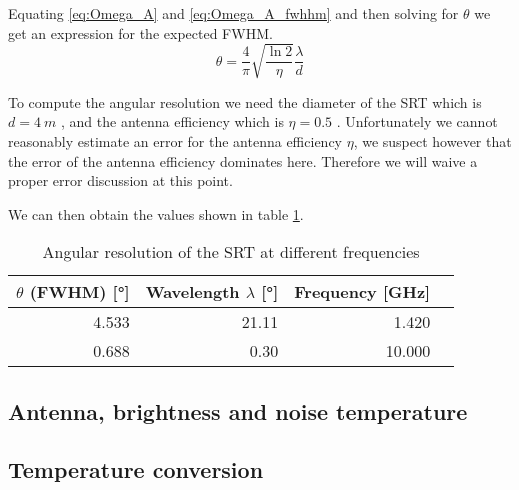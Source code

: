 Equating \eqref{eq:Omega_A} and \eqref{eq:Omega_A_fwhhm} and then solving for $\theta$ we get an expression for the expected FWHM.
\begin{equation}
    \theta = \frac{4}{\pi} \sqrt{\frac{\ln{2}}{\eta}}\frac{\lambda}{d}
\end{equation}

To compute the angular resolution we need the diameter of the SRT which is $d = \SI{4}{m}$ \cite[p. 4]{srt}, and the antenna efficiency which is $\eta = 0.5$ \cite[p. 2]{srt}.
Unfortunately we cannot reasonably estimate an error for the antenna efficiency $\eta$, we suspect however that the error of the antenna efficiency dominates here.
Therefore we will waive a proper error discussion at this point.

We can then obtain the values shown in table \ref{tab:ang_res}.
\begin{table}[H]
    \centering
    \begin{tabular}{rrrr}
        \toprule
        $\theta$ (FWHM) [\si{\degree}] & Wavelength $\lambda$ [\si{\degree}] & Frequency [\si{\giga \hertz}]\\
        \midrule
        \num{4.533} & \num{21.11} & \num{1.420}\\
        \num{0.688} & \num{0.30} & \num{10.000}\\
        \bottomrule
    \end{tabular}
    \caption{Angular resolution of the SRT at different frequencies}
    \label{tab:ang_res}
\end{table}
\subsection{Antenna, brightness and noise temperature}

\subsection{Temperature conversion}

